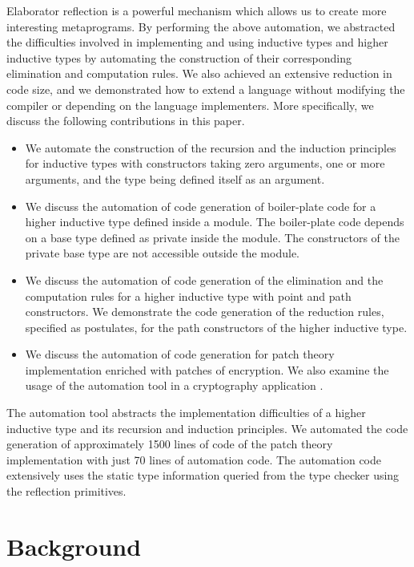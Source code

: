\documentclass[sigplan,10pt]{acmart}
\begin{document}
Elaborator reflection is a powerful mechanism which allows us to create more interesting metaprograms. By performing the above automation, we abstracted the difficulties involved in implementing and using inductive types and higher inductive types by automating the construction of their corresponding elimination and computation rules. We also achieved an extensive reduction in code size, and we demonstrated how to extend a language without modifying the compiler or depending on the language implementers. More specifically, we discuss the following contributions in this paper.

\begin{itemize}
\item We automate the construction of the recursion and the induction principles for inductive types with constructors taking zero arguments, one or more arguments, and the type being defined itself as an argument.

\item We discuss the automation of code generation of boiler-plate code for a higher inductive type defined inside a module. The boiler-plate code depends on a base type defined as private inside the module. The constructors of the private base type are not accessible outside the module.

\item We discuss the automation of code generation of the elimination and the computation rules for a higher inductive type with point and path constructors. We demonstrate the code generation of the reduction rules, specified as postulates, for the path constructors of the higher inductive type.

\item We discuss the automation of code generation for patch theory \cite{Angiuli-2014} implementation enriched with patches of encryption. We also examine the usage of the automation tool in a cryptography application \cite{Paventhan-2018}.
\end{itemize}

The automation tool abstracts the implementation difficulties of a higher inductive type and its recursion and induction principles. We automated the code generation of approximately 1500 lines of code of the patch theory implementation with just 70 lines of automation code. The automation code extensively uses the static type information queried from the type checker using the reflection primitives.

\section{Background}
\label{sec:sec2}
\end{document}
